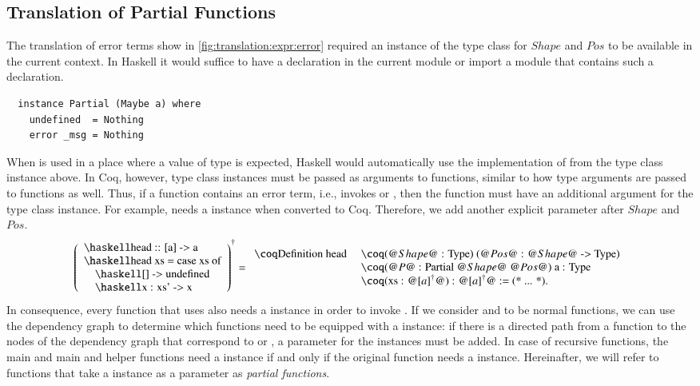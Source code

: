 \subsection{Translation of Partial Functions} \label{sec:translation:func-decl:partial}
The translation of error terms show in \autoref{fig:translation:expr:error} required an instance of the  type class for $Shape$ and $Pos$ to be available in the current context.
In Haskell it would suffice to have a  declaration in the current module or import a module that contains such a declaration.
\begin{verbatim}
  instance Partial (Maybe a) where
    undefined  = Nothing
    error _msg = Nothing
\end{verbatim}
When  is used in a place where a value of type  is expected, Haskell would automatically use the implementation of  from the type class instance above.
In Coq, however, type class instances must be passed as arguments to functions, similar to how type arguments are passed to functions as well.
Thus, if a function contains an error term, i.e., invokes  or , then the function must have an additional argument for the  type class instance.
For example,  needs a  instance when converted to Coq.
Therefore, we add another explicit parameter after $Shape$ and $Pos$.
\[
  \toCoq{\left(\begin{array}{l}
    \haskellM{head :: [a] -> a}           \\
    \haskellM{head xs = case xs of}       \\
    \quad\haskellM{[]      -> undefined} \\
    \quad\haskellM{x : xs' -> x}         \\
  \end{array}\right)}
  = \begin{array}{ll}
    \coqM{Definition head}\;
      &\coqM{(@$\Shape$@ : Type) (@$\Pos$@ : @$\Shape$@ -> Type)} \\
      &\coqM{(@$P$@ : Partial @$\Shape$@ @$\Pos$@) {a : Type}}    \\
      &\coqM{(xs : @$\toCoqX{[a]}$@) : @$\toCoqX{[a]}$@ := (* ... *).}
  \end{array}
\]
In consequence, every function that uses  also needs a  instance in order to invoke .
If we consider  and  to be normal functions, we can use the dependency graph to determine which functions need to be equipped with a  instance: if there is a directed path from a function to the nodes of the dependency graph that correspond to  or , a parameter for the  instances must be added.
In case of recursive functions, the main and main and helper functions need a  instance if and only if the original function needs a  instance.
Hereinafter, we will refer to functions that take a  instance as a parameter as \textit{partial functions}.

